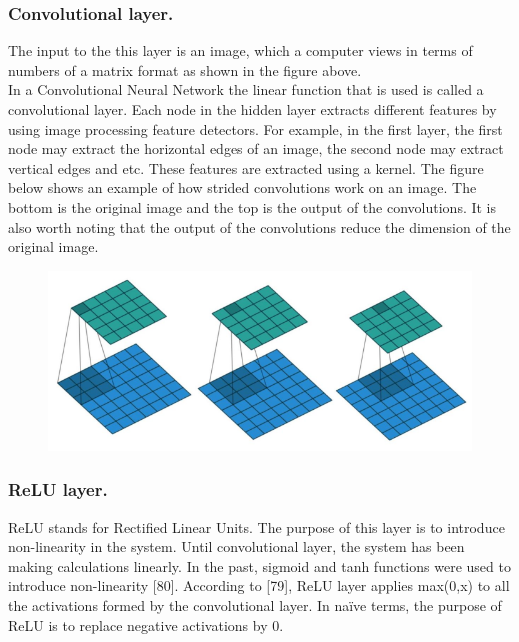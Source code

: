 \documentclass[11pt]{report}
\begin{document}
\subsubsection*{Convolutional layer.}
The input to the this layer is an image, which a computer views in terms of numbers of a matrix format as shown in the figure above.\\

In a Convolutional Neural Network the linear function that is used is called a convolutional layer. Each node
in the hidden layer extracts different features by using image processing feature detectors. For example, in
the first layer, the first node may extract the horizontal edges of an image, the second node may extract
vertical edges and etc. These features are extracted using a kernel. The figure below shows an example of how
strided convolutions work on an image. The bottom is the original image and the top is the output of the
convolutions. It is also worth noting that the output of the convolutions reduce the dimension of the original
image.\\

\begin{figure}[h]
	\centerline{\small 
		\includegraphics[height=0.25\textheight]  {f1}}
\end{figure}

\subsubsection*{ReLU layer.}
ReLU stands for Rectified Linear Units. The purpose of this layer is to introduce non-linearity in the system.
Until convolutional layer, the system has been making calculations linearly. In the past, sigmoid and tanh
functions were used to introduce non-linearity [80]. According to [79], ReLU layer applies max(0,x) to all the
activations formed by the convolutional layer. In naïve terms, the purpose of ReLU is to replace negative
activations by 0.\\
\end{document}
